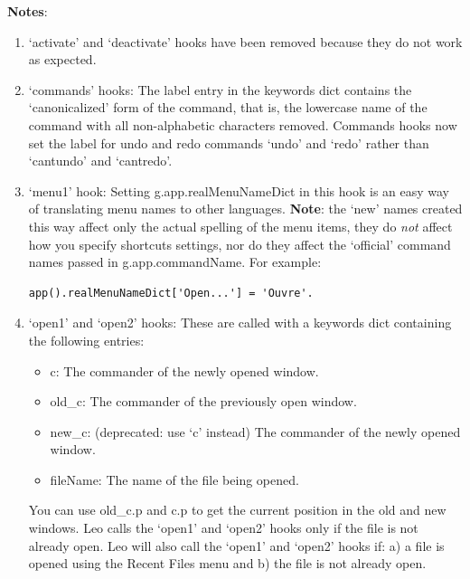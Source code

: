 \documentclass[a4paper,10pt,english]{sphinxmanual}
\begin{document}
\textbf{Notes}:
\begin{enumerate}
\item {} 
`activate' and `deactivate' hooks have been removed because they do not work as expected.

\item {} 
`commands' hooks: The label entry in the keywords dict contains the
`canonicalized' form of the command, that is, the lowercase name of the command
with all non-alphabetic characters removed.
Commands hooks now set the label for undo and redo commands `undo' and `redo'
rather than `cantundo' and `cantredo'.

\item {} 
`menu1' hook: Setting g.app.realMenuNameDict in this hook is an easy way of
translating menu names to other languages. \textbf{Note}: the `new' names created this
way affect only the actual spelling of the menu items, they do \emph{not} affect how
you specify shortcuts settings, nor do they affect the `official'
command names passed in g.app.commandName. For example:

\begin{Verbatim}[commandchars=\\\{\}]
app().realMenuNameDict['Open...'] = 'Ouvre'.
\end{Verbatim}

\item {} 
`open1' and `open2' hooks: These are called with a keywords dict containing the following entries:
\begin{itemize}
\item {} 
c:          The commander of the newly opened window.

\item {} 
old\_c:      The commander of the previously open window.

\item {} 
new\_c:      (deprecated: use `c' instead) The commander of the newly opened window.

\item {} 
fileName:   The name of the file being opened.

\end{itemize}

You can use old\_c.p and c.p to get the current position in the old and new windows.
Leo calls the `open1' and `open2' hooks only if the file is not already open. Leo
will also call the `open1' and `open2' hooks if: a) a file is opened using the
Recent Files menu and b) the file is not already open.


\end{enumerate}
\end{document}
